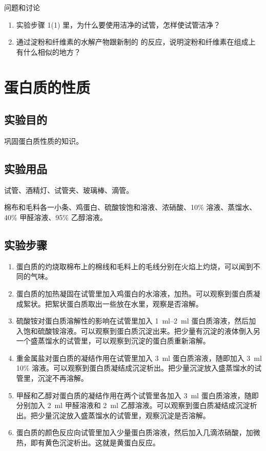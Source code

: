 \begin{Theorem}{问题和讨论}
\begin{enumerate}[1.]
  \item 实验步骤 1(1) 里，为什么要使用洁净的试管，怎样使试管洁净？
  \item 通过淀粉和纤维素的水解产物跟新制的  的反应，说明淀粉和纤维素在组成上有什么相似的地方？
\end{enumerate}
\end{Theorem}


\section{蛋白质的性质}
\subsection*{实验目的}
巩固蛋白质性质的知识。

\subsection*{实验用品}
试管、酒精灯、试管夹、玻璃棒、滴管。

棉布和毛料各一小条、鸡蛋白、硫酸铵饱和溶液、浓硝酸、10\%  溶液、蒸馏水、40\% 甲醛溶液、95\% 乙醇溶液。

\subsection*{实验步骤}
\begin{enumerate}[1.]
  \item 蛋白质的灼烧\quad 取棉布上的棉线和毛料上的毛线分别在火焰上灼烧，可以闻到不同的气味。
  \item 蛋白质的加热凝固\quad 在试管里加入鸡蛋白的水溶液，加热。可以观察到蛋白质凝成絮状。把絮状蛋白质取出一些放在水里，观察是否溶解。
  \item 硫酸铵对蛋白质溶解性的影响\quad 在试管里加入 \qtyrange{1}{2}{ml} 蛋白质溶液，然后加入饱和硫酸铵溶液。可以观察到蛋白质沉淀出来。把少量有沉淀的液体倒入另一个盛蒸馏水的试管里，可以观察到沉淀的蛋白质重新溶解。
  \item 重金属盐对蛋白质的凝结作用\quad 在试管里加入 \qty{3}{ml} 蛋白质溶液，随即加入 \qty{3}{ml} 10\%  溶液。可以观察到蛋白质凝结成沉淀析出。把少量沉淀放入盛蒸馏水的试管里，沉淀不再溶解。
  \item 甲醛和乙醇对蛋白质的凝结作用\quad 在两个试管里各加入 \qty{3}{ml} 蛋白质溶液，随即分别加入 \qty{2}{ml} 甲醛溶液和 \qty{2}{ml} 乙醇溶液。可以观察到蛋白质凝结成沉淀析出。把少量沉淀放入盛蒸馏水的试管里，观察沉淀是否溶解。
  \item 蛋白质的颜色反应\quad 向试管里加入少量蛋白质溶液，然后加入几滴浓硝酸，加微热，即有黄色沉淀析出。这就是黄蛋白反应。
\end{enumerate}

